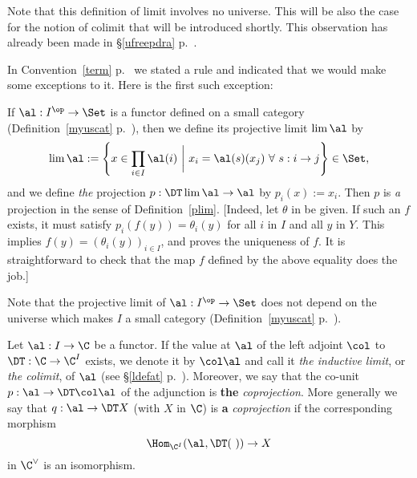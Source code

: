 \documentclass[12pt]{article}
\theoremstyle{remark}
\theoremstyle{definition}
\begin{document}
\begin{rk}
Note that this definition of limit involves no universe. This will be also the case for the notion of colimit that will be introduced shortly. This observation has already been made in \S\ref{ufreepdra} p.~.
\end{rk}

%

In Convention~\ref{term} p.~ we stated a rule and indicated that we would make some exceptions to it. Here is the first such exception:

\begin{conv} 
If $\al:I^{\op}\to\Set$ is a functor defined on a small category (Definition~\ref{myuscat} p.~), then we define its projective limit $\lim\al$ by 
$$ 
\lim\al:=\left\{x\in\prod_{i\in I}\al(i)\ \bigg|\ x_i=\al(s)(x_j)\ \forall\ s:i\to j\right\}\in\Set,
$$ 
and we define \emph{the} projection $p:\DT\lim\al\to\al$ by $p_i(x):=x_i$. Then $p$ is \emph{a} projection in the sense of Definition~\ref{plim}. [Indeed, let $\theta$ in  be given. %
If such an $f$ exists, it must satisfy %
$p_i(f(y))=\theta_i(y)$ for all $i$ in $I$ and all $y$ in $Y$. This implies $f(y)=(\theta_i(y))_{i\in I}$, and proves the uniqueness of $f$. It is straightforward to check that the map $f$ defined by the above equality does the job.]
\end{conv}

Note that the projective limit of $\al:I^{\op}\to\Set$ does not depend on the universe which makes $I$ a small category (Definition~\ref{myuscat} p.~).

\begin{df} 
Let $\al:I\to\C$ be a functor. If the value at $\al$ of the left adjoint $\col$ to $\DT:\C\to\C^I$ exists, we denote it by $\col\al$ and call it {\em the inductive limit}, or {\em the colimit}, of $\al$ (see \S\ref{ldefat} p.~). Moreover, we say that the co-unit $p:\al\to\DT\col\al$ of the adjunction is \textbf{the} \emph{coprojection}. More generally we say that $q:\al\to\DT X$ (with $X$ in $\C$) is \textbf{a} \emph{coprojection} if the corresponding morphism 
$$
\Hom_{\C^I}(\al,\DT(\ ))\to X
$$ 
in $\C^\vee$ is an isomorphism.
\end{df}
\end{document}
